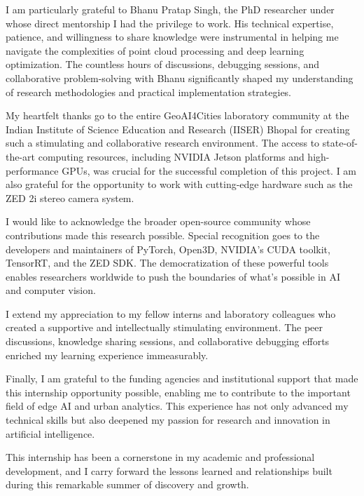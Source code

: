 \documentclass[12pt,a4paper]{report}
\begin{document}
I am particularly grateful to Bhanu Pratap Singh, the PhD researcher under whose direct mentorship I had the privilege to work. His technical expertise, patience, and willingness to share knowledge were instrumental in helping me navigate the complexities of point cloud processing and deep learning optimization. The countless hours of discussions, debugging sessions, and collaborative problem-solving with Bhanu significantly shaped my understanding of research methodologies and practical implementation strategies.

My heartfelt thanks go to the entire GeoAI4Cities laboratory community at the Indian Institute of Science Education and Research (IISER) Bhopal for creating such a stimulating and collaborative research environment. The access to state-of-the-art computing resources, including NVIDIA Jetson platforms and high-performance GPUs, was crucial for the successful completion of this project. I am also grateful for the opportunity to work with cutting-edge hardware such as the ZED 2i stereo camera system.

I would like to acknowledge the broader open-source community whose contributions made this research possible. Special recognition goes to the developers and maintainers of PyTorch, Open3D, NVIDIA's CUDA toolkit, TensorRT, and the ZED SDK. The democratization of these powerful tools enables researchers worldwide to push the boundaries of what's possible in AI and computer vision.

I extend my appreciation to my fellow interns and laboratory colleagues who created a supportive and intellectually stimulating environment. The peer discussions, knowledge sharing sessions, and collaborative debugging efforts enriched my learning experience immeasurably.

Finally, I am grateful to the funding agencies and institutional support that made this internship opportunity possible, enabling me to contribute to the important field of edge AI and urban analytics. This experience has not only advanced my technical skills but also deepened my passion for research and innovation in artificial intelligence.

This internship has been a cornerstone in my academic and professional development, and I carry forward the lessons learned and relationships built during this remarkable summer of discovery and growth.




\appendix
\end{document}
